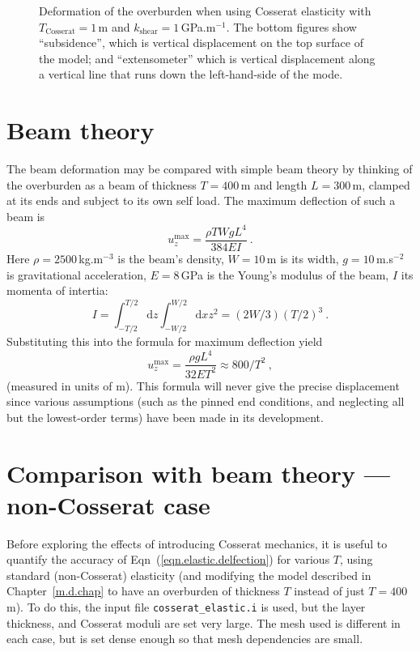 \documentclass[]{scrreprt}
\begin{document}
\begin{figure}[htbp]
\begin{center}
\begin{tabular}{cc}
    \end{tabular}
\caption{Deformation of the overburden when using Cosserat elasticity
  with $T_{\mathrm{Cosserat}}=1$\,m and $k_{\mathrm{shear}}=1$\,GPa.m$^{-1}$.
  The bottom figures show ``subsidence'', which is vertical
  displacement on the top surface of the model; and ``extensometer''
  which is vertical displacement along a vertical line that runs down
  the left-hand-side of the mode.}
\label{cosserat_elastic_fig}
\end{center}
\end{figure}

\section{Beam theory}

The beam deformation may be compared with simple beam theory by
thinking of the overburden as a beam of thickness $T=400$\,m and
length $L=300$\,m, clamped at its ends and subject to its own self
load.  The maximum deflection of such a beam is
\begin{equation}
  u_{z}^{\mathrm{max}} = \frac{\rho TW g L^{4}}{384 EI} \ .
\end{equation}
Here $\rho=2500$\,kg.m$^{-3}$ is the beam's density, $W=10$\,m is its
width, $g=10$\,m.s$^{-2}$ is gravitational acceleration, $E=8$\,GPa is
the Young's modulus of the beam, $I$ its momenta of intertia:
\begin{equation}
  I = \int_{-T/2}^{T/2}{\mathrm d}z \int_{-W/2}^{W/2}{\mathrm d}x
  z^{2} = (2W/3)(T/2)^3 \ .
\end{equation}
Substituting this into the formula for maximum deflection yield
\begin{equation}
  u_{z}^{\mathrm{max}} = \frac{\rho g L^{4}}{32 ET^2} \approx
  800/T^{2} \ ,
  \label{eqn.elastic.delfection}
\end{equation}
(measured in units of m).
This formula will never give the precise displacement since various
assumptions (such as the pinned end conditions, and neglecting all but
the lowest-order terms) have been made in its
development.

\section{Comparison with beam theory --- non-Cosserat case}

Before
exploring the effects of introducing Cosserat mechanics, it is useful
to quantify the accuracy of Eqn~(\ref{eqn.elastic.delfection}) for
various $T$, using standard (non-Cosserat) elasticity (and modifying
the model described in Chapter~\ref{m.d.chap} to have an overburden of
thickness $T$ instead of just $T=400$\,m).    To do this,
the input file {\tt cosserat\_elastic.i} is used, but the layer
thickness, and Cosserat moduli are set very large.  The mesh used is
different in each case, but is set dense enough so that mesh
dependencies are small.
\end{document}
